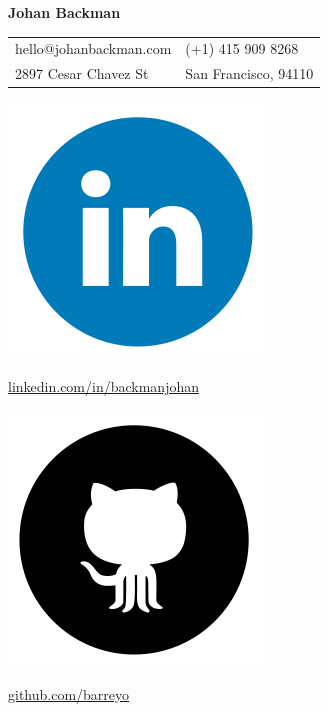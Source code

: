 \documentclass{cv_doc}
\begin{document}
\textbf{{\sffamily\huge Johan Backman}} \\

\begin{tabular}{@{}l l }
 hello@johanbackman.com & (+1) 415 909 8268 \\
 2897 Cesar Chavez St & San Francisco, 94110 \\
\end{tabular}

\vspace{0.12cm}

\begin{minipage}[c]{0.03\textwidth}
\includegraphics[scale=0.04]{linkedin}
\end{minipage}
\begin{minipage}[c]{0.25\textwidth}
{\small \href{https://linkedin.com/in/backmanjohan}{linkedin.com/in/backmanjohan}}
\end{minipage}

\begin{minipage}[c]{0.03\textwidth}
\includegraphics[scale=0.04]{github}
\end{minipage}
\begin{minipage}[c]{0.25\textwidth}
{\small \href{https://github.com/barreyo}{github.com/barreyo}}
\end{minipage}
\end{document}
